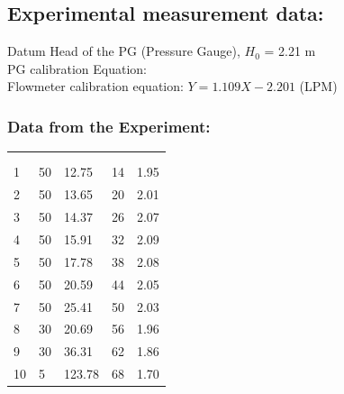 \documentclass[12pt]{article}
\begin{document}
\subsection*{Experimental measurement data:}
Datum Head of the PG (Pressure Gauge), $H_0$ = 2.21 m \\
PG calibration Equation: \\
Flowmeter calibration equation: $Y = 1.109 X - 2.201$ (LPM) \\

\subsubsection*{Data from the Experiment:}
\begin{center}
  \begin{tabularx}{\textwidth}{X*{4}{X}}
  \hline
   &  &  &  \\ 
   &  &  & & \\
   & & & &
  \\
    & 50 & 12.75 & 14 & 1.95 \\
  2 & 50 & 13.65 & 20 & 2.01 \\
  3 & 50 & 14.37 & 26 & 2.07 \\
  4 & 50 & 15.91 & 32 & 2.09 \\
  5 & 50 & 17.78 & 38 & 2.08 \\
  6 & 50 & 20.59 & 44 & 2.05\\
  7 & 50 & 25.41 & 50 & 2.03 \\
  8 & 30 & 20.69 & 56 & 1.96 \\
  9 & 30 & 36.31 & 62 & 1.86 \\
  10 & 5 & 123.78 & 68 & 1.70 \\ \hline 
  \end{tabularx}
  \end{center}

\vspace*{1cm}
\end{document}
